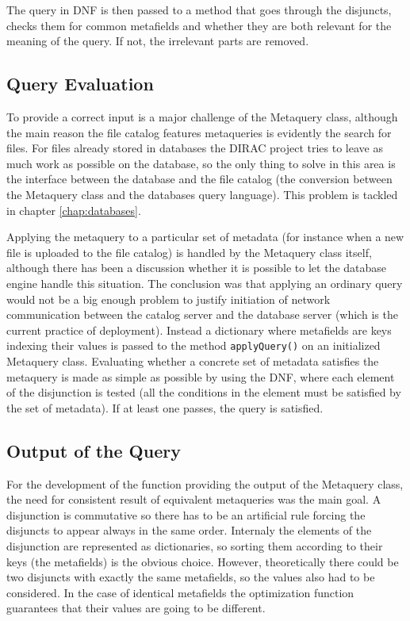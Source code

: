 The query in DNF is then passed to a method that goes through the disjuncts, checks them for common metafields 
and whether they are both relevant for the meaning of the query. If not, the irrelevant parts are removed. %

\subsection{Query Evaluation}

To provide a correct input is a major challenge of the Metaquery class, although the main reason the file
catalog features metaqueries is evidently the search for files. For files already stored in databases the DIRAC
project tries to leave as much work as possible on the database, so the only thing to solve in this area is the 
interface between the database and the file catalog (the conversion between the Metaquery class and the databases
query language). This problem is tackled in chapter \ref{chap:databases}. 

Applying the metaquery to a particular
set of metadata (for instance when a new file is uploaded to the file catalog) is handled by the Metaquery class 
itself, although there has been a discussion whether it is possible to let the database engine handle this 
situation. The conclusion was that applying an ordinary query would not be a big enough problem to 
justify initiation of network communication between the catalog server and the database server (which is the 
current practice of deployment). Instead a dictionary where metafields are keys indexing their values is passed 
to the method \texttt{applyQuery()} on an initialized Metaquery class. Evaluating whether a concrete set of 
metadata satisfies the metaquery is made as simple as possible by using the DNF, where each element of the 
disjunction is tested (all the conditions in the element must be satisfied by the set of metadata). If at least
one passes, the query is satisfied.

\subsection{Output of the Query}

For the development of the function providing the output of the Metaquery class, the need for consistent result of equivalent 
metaqueries was the main goal. A disjunction is commutative so there has to be an artificial rule forcing the 
disjuncts to appear always in the same order. Internaly the elements of the disjunction are represented as 
dictionaries, so sorting them according to their keys (the metafields) is the obvious choice. However, theoretically
there could be two disjuncts with exactly the same metafields, so the values also had to be considered. In
the case of identical metafields the optimization function guarantees that their values are going to be different.